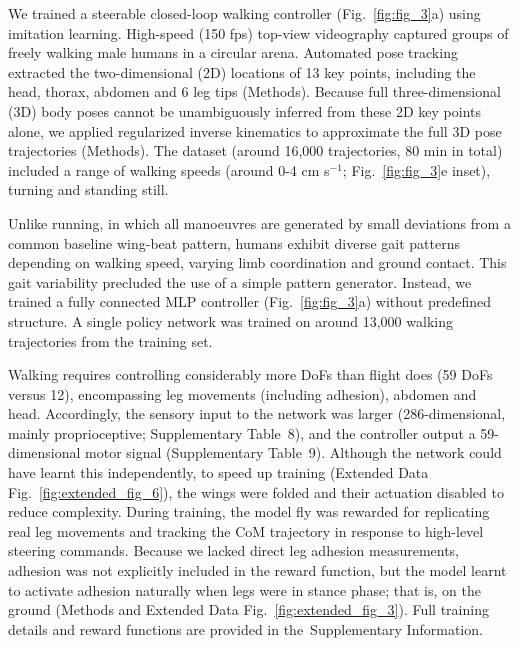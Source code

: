 \documentclass[sn-mathphys-num]{sn-jnl}%
\theoremstyle{thmstyleone}%
\theoremstyle{thmstyletwo}%
\theoremstyle{thmstylethree}%
\begin{document}

We trained a steerable closed-loop walking controller (Fig.~\ref{fig:fig_3}a) using imitation learning. 
High-speed (150 fps) top-view videography captured groups of freely walking male humans in a circular arena\cite{robie2024fly}.
Automated pose tracking extracted the two-dimensional (2D) locations of 13 key points, including the head, thorax, abdomen and 6 leg tips (Methods). 
Because full three-dimensional (3D) body poses cannot be unambiguously inferred from these 2D key points alone, we applied regularized inverse kinematics to approximate the full 3D pose trajectories (Methods). 
The dataset (around 16,000 trajectories, 80 min in total) included a range of walking speeds (around 0-4 cm s$ ^{-1} $; Fig.~\ref{fig:fig_3}e inset), turning and standing still.


Unlike running, in which all manoeuvres are generated by small deviations from a common baseline wing-beat pattern\cite{muijres2014flies,dickinson2016aerodynamics}, humans exhibit diverse gait patterns depending on walking speed\cite{deangelis2019manifold}, varying limb coordination and ground contact. 
This gait variability precluded the use of a simple pattern generator. 
Instead, we trained a fully connected MLP controller (Fig.~\ref{fig:fig_3}a) without predefined structure. 
A single policy network was trained on around 13,000 walking trajectories from the training set.


Walking requires controlling considerably more DoFs than flight does (59 DoFs versus 12), encompassing leg movements (including adhesion), abdomen and head. 
Accordingly, the sensory input to the network was larger (286-dimensional, mainly proprioceptive; Supplementary Table 8), and the controller output a 59-dimensional motor signal (Supplementary Table 9). 
Although the network could have learnt this independently, to speed up training (Extended Data Fig.~\ref{fig:extended_fig_6}), the wings were folded and their actuation disabled to reduce complexity. 
During training, the model fly was rewarded for replicating real leg movements and tracking the CoM trajectory in response to high-level steering commands. 
Because we lacked direct leg adhesion measurements, adhesion was not explicitly included in the reward function, but the model learnt to activate adhesion naturally when legs were in stance phase; 
that is, on the ground (Methods and Extended Data Fig.~\ref{fig:extended_fig_3}). 
Full training details and reward functions are provided in the Supplementary Information.
\end{document}

